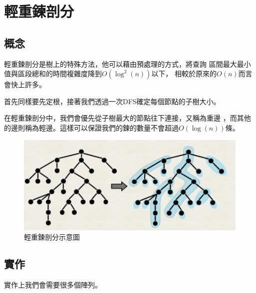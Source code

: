 \section{輕重鍊剖分}
    \subsection{概念}
    輕重鍊剖分是樹上的特殊方法，他可以藉由預處理的方式，將查詢
    區間最大最小值與區段總和的時間複雜度降到$O(\log^{2}{(n)})$以下，
    相較於原來的$O(n)$而言會快上許多。

    首先同樣要先定根，接著我們透過一次DFS確定每個節點的子樹大小。

    在輕重鍊剖分中，我們會優先從子樹最大的節點往下連接，又稱為重邊
    ，而其他的邊則稱為輕邊。這樣可以保證我們的鍊的數量不會超過$O(\log{(n)})$條。

    \begin{figure}[h]
        \centering
        \includegraphics[width=\textwidth]{../Images/HLD.png}
        \caption{輕重鍊剖分示意圖}
    \end{figure}

    \subsection{實作}
    實作上我們會需要很多個陣列。

